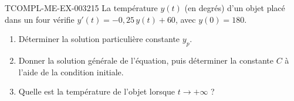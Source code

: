 \begin{exercice}{TCOMPL-ME-EX-003}{2}{15}
La température $y(t)$ (en degrés) d'un objet placé dans un four vérifie $y'(t) = -0{,}25\,y(t) + 60$, avec $y(0)=180$.
\begin{enumerate}
  \item Déterminer la solution particulière constante $y_p$.
  \item Donner la solution générale de l'équation, puis déterminer la constante $C$ à l'aide de la condition initiale.
  \item Quelle est la température de l'objet lorsque $t \to +\infty$ ?
\end{enumerate}
\end{exercice}
